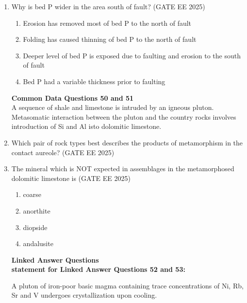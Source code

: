 \documentclass[journal]{IEEEtran}
\begin{document}
\begin{enumerate}[start=1]
\item Why is bed P wider in the area south of fault?
\hfill{(GATE EE 2025)}
\begin{enumerate}
    \item Erosion has removed most of bed P to the north of fault
    \item Folding has caused thinning of bed P to the north of fault
    \item Deeper level of bed P is exposed due to faulting and erosion to the south of fault
    \item Bed P had a variable thickness prior to faulting
\end{enumerate}

\textbf{Common Data Questions 50 and 51}\\
A sequence of shale and limestone is intruded by an igneous pluton. Metasomatic interaction between the pluton and the country rocks involves introduction of Si and Al isto dolomitic limestone.
\vspace{0.6cm}
\item  Which pair of rock types best describes the products of metamorphism in the contact aureole?
\hfill{(GATE EE 2025)}
\begin{enumerate}
\end{enumerate}

\item The mineral which is NOT expected in assemblages in the metamorphosed dolomitic limestone is
\hfill{(GATE EE 2025)}
\begin{enumerate}
    \item coarse
    \item  anorthite
\item diopside
\item andalusite

\end{enumerate}
\textbf{Linked Answer Questions}\\
\textbf{statement for Linked Answer Questions 52 and 53:}

A pluton of iron-poor basic magma containing trace concentrations of Ni, Rb, Sr and V undergoes crystallization upon cooling.


\end{enumerate}
\end{document}
